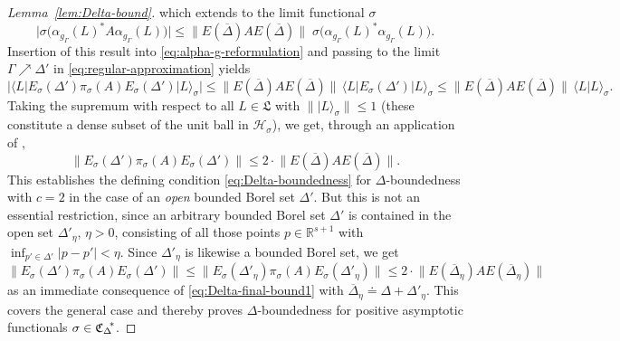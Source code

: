 \documentclass[a4paper,a4paper]{article}
\numberwithin{equation}{section}
\newcommand{\Lfrak}{\mathfrak{L}}
\newcommand{\Hscr}{\mathscr{H}}
\newcommand{\Rsone}{\mathbb{R}^{s + 1}}
\newcommand{\Deltaetabar}{\overline{\Delta}_\eta}
\newcommand{\EDbar}{E ( \overline{\Delta} )}
\newcommand{\EDetabar}{E ( \overline{\Delta}_\eta )}
\newcommand{\EsDprime}{E_\sigma ( \Delta' )}
\newcommand{\EsDprimeeta}{E_\sigma ( \Delta'_\eta )}
\newcommand{\CDstar}{{\mathfrak{C}_\Delta}^{\negthickspace *}}
\newcommand{\agGamma}{\alpha_{g_\Gamma}}
\theoremstyle{definition}
\theoremstyle{plain}
\theoremstyle{remark}
\newcommand{\abs}[1]{\lvert #1 \rvert}
\newcommand{\babs}[1]{\bigl\lvert #1 \bigr\rvert}
\newcommand{\norm}[1]{\lVert #1 \rVert}
\newcommand{\ket}[1]{\vert #1 \rangle}
\newcommand{\scp}[2]{\langle #1 \vert #2 \rangle}
\newcommand{\scpx}[3]{\langle #1 \vert #2 \vert #3 \rangle}
\begin{document}
\begin{proof}[Lemma~\ref{lem:Delta-bound}]
    which extends to the limit functional $\sigma$
    \begin{equation}
      \label{eq:Delta-bound-estimate1}
      \babs{\sigma \bigl( \agGamma ( L )^* A \agGamma ( L ) \bigr)}
      \leqslant \norm{\EDbar A \EDbar} \; \sigma \bigl( \agGamma ( L
      )^* \agGamma ( L ) \bigr) \text{.}
    \end{equation}
    Insertion of this result into \eqref{eq:alpha-g-reformulation} and
    passing to the limit $\Gamma \nearrow \Delta'$ in
    \eqref{eq:regular-approximation} yields
    \begin{equation}
      \label{eq:Delta-bound-estimate3}
      \babs{\scpx{L}{\EsDprime \pi_\sigma ( A ) \EsDprime}{L}_\sigma}
      \leqslant \norm{\EDbar A \EDbar} \,
      \scpx{L}{\EsDprime}{L}_\sigma \leqslant \norm{\EDbar A \EDbar}
      \, \scp{L}{L}_\sigma \text{.}
    \end{equation}
    Taking the supremum with respect to all $L \in \Lfrak$ with
    $\norm{\ket{L}_\sigma} \leqslant 1$ (these constitute a dense
    subset of the unit ball in $\Hscr_\sigma$), we get, through an
    application of \cite[Satz~4.4]{weidmann:1976},
    \begin{equation}
      \label{eq:Delta-final-bound1}
      \norm{\EsDprime \pi_\sigma ( A ) \EsDprime} \leqslant 2 \cdot
      \norm{\EDbar A \EDbar} \text{.}
    \end{equation}
    This establishes the defining condition
    \eqref{eq:Delta-boundedness} for $\Delta$-boundedness with $c = 2$
    in the case of an \emph{open} bounded Borel set $\Delta'$. But
    this is not an essential restriction, since an arbitrary bounded
    Borel set $\Delta'$ is contained in the open set $\Delta'_\eta$,
    $\eta > 0$, consisting of all those points $p \in \Rsone$ with
    $\inf_{p' \in \Delta'} \abs{p - p'} < \eta$. Since $\Delta'_\eta$
    is likewise a bounded Borel set, we get
    \begin{equation}
      \label{eq:Delta-final-bound2}
      \norm{\EsDprime \pi_\sigma ( A ) \EsDprime} \leqslant
      \norm{\EsDprimeeta \pi_\sigma ( A ) \EsDprimeeta} \leqslant 2
      \cdot \norm{\EDetabar A \EDetabar}
    \end{equation}
    as an immediate consequence of \eqref{eq:Delta-final-bound1} with
    $\Deltaetabar \doteq \Delta + \Delta'_\eta$. This covers the
    general case and thereby proves $\Delta$-boundedness for positive
    asymptotic functionals $\sigma \in \CDstar$.
  \end{proof}
\end{document}
